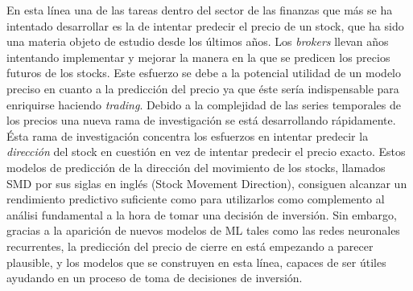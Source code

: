 \documentclass[]{DissertateUSU}
\begin{document}
\noindent En esta línea una de las tareas dentro del sector de las
finanzas que más se ha intentado desarrollar es la de intentar predecir
el precio de un stock, que ha sido una materia objeto de estudio desde
los últimos años. Los \emph{brokers} llevan años intentando implementar
y mejorar la manera en la que se predicen los precios futuros de los
stocks. Este esfuerzo se debe a la potencial utilidad de un modelo
preciso en cuanto a la predicción del precio ya que éste sería
indispensable para enriquirse haciendo \emph{trading}. Debido a la
complejidad de las series temporales de los precios una nueva rama de
investigación se está desarrollando rápidamente. Ésta rama de
investigación concentra los esfuerzos en intentar predecir la
\emph{dirección} del stock en cuestión en vez de intentar predecir el
precio exacto. Estos modelos de predicción de la dirección del
movimiento de los stocks, llamados SMD por sus siglas en inglés (Stock
Movement Direction), consiguen alcanzar un rendimiento predictivo
suficiente como para utilizarlos como complemento al análisi fundamental
a la hora de tomar una decisión de inversión. Sin embargo, gracias a la
aparición de nuevos modelos de ML tales como las redes neuronales
recurrentes, la predicción del precio de cierre en está empezando a
parecer plausible, y los modelos que se construyen en esta línea,
capaces de ser útiles ayudando en un proceso de toma de decisiones de
inversión.

\justifying
\end{document}
